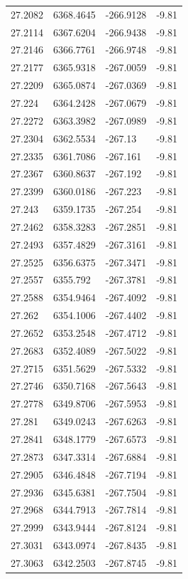 \begin{table}[H]
\begin{tabular}{llll}
27.2082 & 6368.4645 & -266.9128 & -9.81 \\
27.2114 & 6367.6204 & -266.9438 & -9.81 \\
27.2146 & 6366.7761 & -266.9748 & -9.81 \\
27.2177 & 6365.9318 & -267.0059 & -9.81 \\
27.2209 & 6365.0874 & -267.0369 & -9.81 \\
27.224 & 6364.2428 & -267.0679 & -9.81 \\
27.2272 & 6363.3982 & -267.0989 & -9.81 \\
27.2304 & 6362.5534 & -267.13 & -9.81 \\
27.2335 & 6361.7086 & -267.161 & -9.81 \\
27.2367 & 6360.8637 & -267.192 & -9.81 \\
27.2399 & 6360.0186 & -267.223 & -9.81 \\
27.243 & 6359.1735 & -267.254 & -9.81 \\
27.2462 & 6358.3283 & -267.2851 & -9.81 \\
27.2493 & 6357.4829 & -267.3161 & -9.81 \\
27.2525 & 6356.6375 & -267.3471 & -9.81 \\
27.2557 & 6355.792 & -267.3781 & -9.81 \\
27.2588 & 6354.9464 & -267.4092 & -9.81 \\
27.262 & 6354.1006 & -267.4402 & -9.81 \\
27.2652 & 6353.2548 & -267.4712 & -9.81 \\
27.2683 & 6352.4089 & -267.5022 & -9.81 \\
27.2715 & 6351.5629 & -267.5332 & -9.81 \\
27.2746 & 6350.7168 & -267.5643 & -9.81 \\
27.2778 & 6349.8706 & -267.5953 & -9.81 \\
27.281 & 6349.0243 & -267.6263 & -9.81 \\
27.2841 & 6348.1779 & -267.6573 & -9.81 \\
27.2873 & 6347.3314 & -267.6884 & -9.81 \\
27.2905 & 6346.4848 & -267.7194 & -9.81 \\
27.2936 & 6345.6381 & -267.7504 & -9.81 \\
27.2968 & 6344.7913 & -267.7814 & -9.81 \\
27.2999 & 6343.9444 & -267.8124 & -9.81 \\
27.3031 & 6343.0974 & -267.8435 & -9.81 \\
27.3063 & 6342.2503 & -267.8745 & -9.81 \\

\end{tabular}
\end{table}
